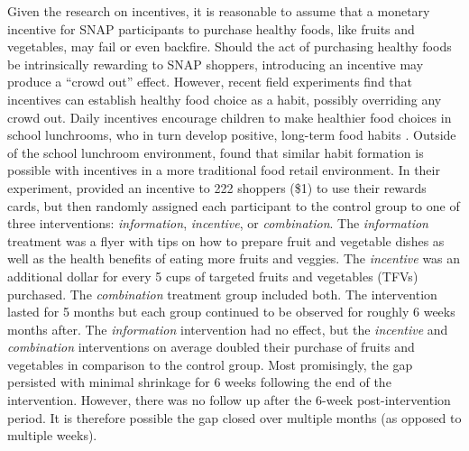 \documentclass[12pt,letterpaperpaper,]{book}
\begin{document}
Given the research on incentives, it is reasonable to assume that a
monetary incentive for SNAP participants to purchase healthy foods, like
fruits and vegetables, may fail or even backfire. Should the act of
purchasing healthy foods be intrinsically rewarding to SNAP shoppers,
introducing an incentive may produce a ``crowd out'' effect. However,
recent field experiments find that incentives can establish healthy food
choice as a habit, possibly overriding any crowd out. Daily incentives
encourage children to make healthier food choices in school lunchrooms,
who in turn develop positive, long-term food habits
\citep{loewenstein_habit_2016, list_behavioralist_2015, belot_incentives_2014}.
Outside of the school lunchroom environment,
\citet{list_incentives_2015} found that similar habit formation is
possible with incentives in a more traditional food retail environment.
In their experiment, \citet{list_incentives_2015} provided an incentive
to 222 shoppers (\$1) to use their rewards cards, but then randomly
assigned each participant to the control group to one of three
interventions: \emph{information}, \emph{incentive}, or
\emph{combination}. The \emph{information} treatment was a flyer with
tips on how to prepare fruit and vegetable dishes as well as the health
benefits of eating more fruits and veggies. The \emph{incentive} was an
additional dollar for every 5 cups of targeted fruits and vegetables
(TFVs) purchased. The \emph{combination} treatment group included both.
The intervention lasted for 5 months but each group continued to be
observed for roughly 6 weeks months after. The \emph{information}
intervention had no effect, but the \emph{incentive} and
\emph{combination} interventions on average doubled their purchase of
fruits and vegetables in comparison to the control group. Most
promisingly, the gap persisted with minimal shrinkage for 6 weeks
following the end of the intervention. However, there was no follow up
after the 6-week post-intervention period. It is therefore possible the
gap closed over multiple months (as opposed to multiple weeks).
\end{document}
